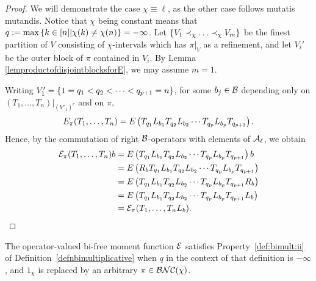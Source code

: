 		\begin{proof}
			We will demonstrate the case $\chi \equiv \ell$, as the other case follows mutatis mutandis.
			Notice that $\chi$ being constant means that $q := \max\left\{k\in[n] | \chi(k) \neq \chi(n)\right\} = -\infty$.
			Let $\left\{V_1 \prec_\chi \ldots \prec_\chi V_m\right\}$ be the finest partition of $V$ consisting of $\chi$-intervals which has $\pi|_V$ as a refinement, and let $V_i'$ be the outer block of $\pi$ contained in $V_i$.
			By Lemma \ref{lemproductofdisjointblocksforE}, we may assume $m = 1$.


			Writing $V_1' = \left\{1 = q_1 < q_2 < \cdots < q_{p+1} = n\right\}$, for some $b_j \in \mathcal{B}$ depending only on $(T_1, \ldots, T_n)|_{(V'_1)^c}$ and on $\pi$,
			\[
				E_\pi(T_1, \ldots, T_n) = E\left( T_{q_1} L_{b_1} T_{q_2} L_{b_2} \cdots T_{q_p} L_{b_p} T_{q_{p+1}}\right).
			\]
			Hence, by the commutation of right $\mathcal{B}$-operators with elements of $\mathcal{A}_\ell$, we obtain
			\begin{align*}
				\mathcal{E}_\pi(T_1, \ldots, T_n)b & = E\left( T_{q_1} L_{b_1} T_{q_2} L_{b_2} \cdots T_{q_p} L_{b_p} T_{q_{p+1}}\right)b\\
				& = E\left( R_b T_{q_1} L_{b_1} T_{q_2} L_{b_2} \cdots T_{q_p} L_{b_p} T_{q_{p+1}}\right)\\
				& = E\left( T_{q_1} L_{b_1} T_{q_2} L_{b_2} \cdots T_{q_p} L_{b_p} T_{q_{p+1}}R_b \right)\\
				& = E\left( T_{q_1} L_{b_1} T_{q_2} L_{b_2} \cdots T_{q_p} L_{b_p} T_{q_{p+1}}L_b \right)\\
				& = \mathcal{E}_\pi(T_1, \ldots, T_n L_b).\qedhere
			\end{align*}
		\end{proof}


		\begin{lemma}
			\label{lemenhancedpropertyiiforE}
			The operator-valued bi-free moment function $\mathcal{E}$ satisfies Property~\ref{def:bimult:ii} of Definition~\ref{defnbimultiplicative} when $q$ in the context of that definition is $-\infty$, and $1_\chi$ is replaced by an arbitrary $\pi \in \mathcal{BNC}(\chi)$.
		\end{lemma}


